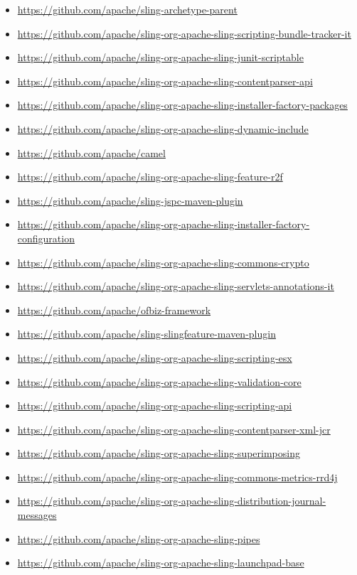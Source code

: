 \documentclass[sigconf]{acmart}
\begin{document}
\begin{itemize}
  \item \url{https://github.com/apache/sling-archetype-parent}
  \item \url{https://github.com/apache/sling-org-apache-sling-scripting-bundle-tracker-it}
  \item \url{https://github.com/apache/sling-org-apache-sling-junit-scriptable}
  \item \url{https://github.com/apache/sling-org-apache-sling-contentparser-api}
  \item \url{https://github.com/apache/sling-org-apache-sling-installer-factory-packages}
  \item \url{https://github.com/apache/sling-org-apache-sling-dynamic-include}
  \item \url{https://github.com/apache/camel}
  \item \url{https://github.com/apache/sling-org-apache-sling-feature-r2f}
  \item \url{https://github.com/apache/sling-jspc-maven-plugin}
  \item \url{https://github.com/apache/sling-org-apache-sling-installer-factory-configuration}
  \item \url{https://github.com/apache/sling-org-apache-sling-commons-crypto}
  \item \url{https://github.com/apache/sling-org-apache-sling-servlets-annotations-it}
  \item \url{https://github.com/apache/ofbiz-framework}
  \item \url{https://github.com/apache/sling-slingfeature-maven-plugin}
  \item \url{https://github.com/apache/sling-org-apache-sling-scripting-esx}
  \item \url{https://github.com/apache/sling-org-apache-sling-validation-core}
  \item \url{https://github.com/apache/sling-org-apache-sling-scripting-api}
  \item \url{https://github.com/apache/sling-org-apache-sling-contentparser-xml-jcr}
  \item \url{https://github.com/apache/sling-org-apache-sling-superimposing}
  \item \url{https://github.com/apache/sling-org-apache-sling-commons-metrics-rrd4j}
  \item \url{https://github.com/apache/sling-org-apache-sling-distribution-journal-messages}
  \item \url{https://github.com/apache/sling-org-apache-sling-pipes}
  \item \url{https://github.com/apache/sling-org-apache-sling-launchpad-base}

\end{itemize}
\end{document}
